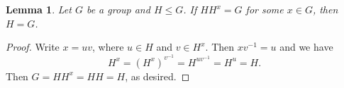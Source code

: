 \documentclass[12pt]{article}
\theoremstyle{thmstyle}
\newtheorem{lemma}[theorem]{Lemma}
\newtheorem{proposition}[theorem]{Proposition}
\theoremstyle{defstyle}
\renewcommand{\le}{\leqslant}
\newcommand{\nor}{\vartriangleleft}
\newcommand{\subnor}{\nor\!\nor}
\begin{document}
\begin{lemma}
    Let $G$ be a group and $H\le G$. If $HH^x = G$ for some $x\in G$, then $H = G$.
\end{lemma}
\begin{proof}
    Write $x = uv$, where $u\in H$ and $v\in H^x$. Then $xv^{-1} = u$ and we have 
    \begin{equation*}
        H^x = \left(H^x\right)^{v^{-1}} = H^{uv^{-1}} = H^u = H.
    \end{equation*}
    Then $G = HH^x = HH = H$, as desired.
\end{proof}

    
\end{document}
